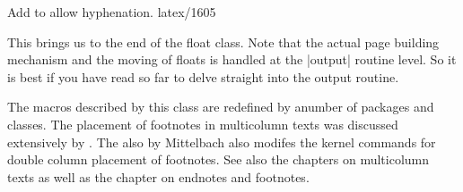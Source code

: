  \begin{macro}{\@footnotemark}
         {Add  to allow hyphenation. latex/1605}
    \begin{teX}
\def\@footnotemark{%
  \leavevmode
  \ifhmode\edef\@x@sf{\the\spacefactor}\nobreak\fi
  \@makefnmark
  \ifhmode\spacefactor\@x@sf\fi
  \relax}
    \end{teX}
 \end{macro}
%
 \begin{macro}{\footnotetext}
    \begin{teX}
\def\footnotetext{%
     \@ifnextchar [\@xfootnotenext
       {\protected@xdef\@thefnmark{\thempfn}%
    \@footnotetext}}
    \end{teX}
 \end{macro}
%
 \begin{macro}{\@xfootnotenext}
    \begin{teX}
\def\@xfootnotenext[#1]{%
  \begingroup 
     \csname c@\@mpfn\endcsname #1\relax
     \unrestored@protected@xdef\@thefnmark{\thempfn}%
  \endgroup
  \@footnotetext}
    \end{teX}
 \end{macro}
%
 \begin{macro}{\thempfn}
 \begin{macro}{\@mpfn}
    \begin{teX}
\def\@mpfn{footnote}
\def\thempfn{\thefootnote}
    \end{teX}
 \end{macro}
 \end{macro}

This brings us to the end of the float class. Note that the actual page building mechanism and the moving
of floats is handled at the |output| routine level. So it is best if you have read so far to delve straight into the
output routine.

The macros described by this class are redefined by anumber of packages and classes. The placement of footnotes in multicolumn texts was discussed extensively by \citeyearpar{mittelbach1990}. The  also by
Mittelbach \citeyearpar{mittelbach2014} also modifes the kernel commands for double column placement of footnotes. See also the chapters on multicolumn texts as well as the chapter on endnotes and footnotes.

